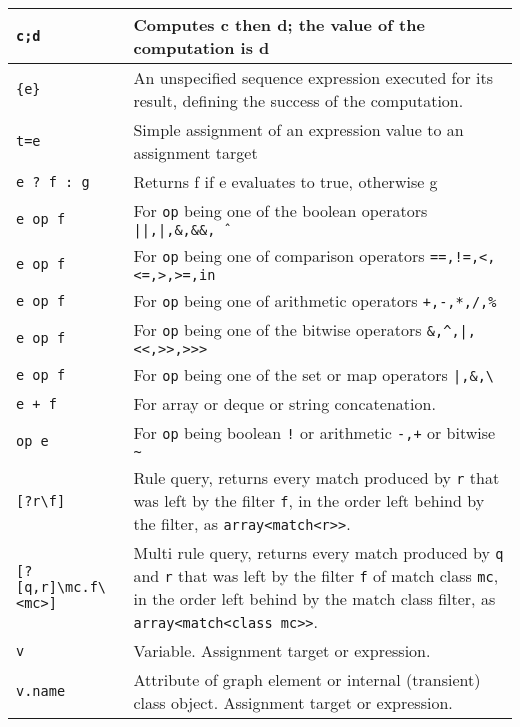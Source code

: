 \begin{table}[htbp]
\begin{minipage}{\linewidth} \renewcommand{\footnoterule}{} 
\begin{tabularx}{\linewidth}{|lX|}
\hline
\texttt{c;d} & Computes c then d; the value of the computation is d\\
\hline
\texttt{\{e\}} & An unspecified sequence expression executed for its result, defining the success of the computation.\\
\hline
\texttt{t=e} & Simple assignment of an expression value to an assignment target\\
\hline
\texttt{e ? f : g} & Returns f if e evaluates to true, otherwise g \\
\texttt{e op f} & For \texttt{op} being one of the boolean operators \texttt{||,|,\&,\&\&,\^\ } \\
\texttt{e op f} & For \texttt{op} being one of comparison operators \texttt{==,!=,<,<=,>,>=,in} \\
\texttt{e op f} & For \texttt{op} being one of arithmetic operators \texttt{+,-,*,/,\%} \\
\texttt{e op f} & For \texttt{op} being one of the bitwise operators \texttt{\&,\^{},|,<<,>>,>>> } \\
\texttt{e op f} & For \texttt{op} being one of the set or map operators \texttt{|,\&,\textbackslash} \\
\texttt{e + f} & For array or deque or string concatenation. \\
\texttt{op e} & For \texttt{op} being boolean \texttt{!} or arithmetic \texttt{-,+} or bitwise \texttt{\textasciitilde}\\
\hline
\texttt{[?r\textbackslash f]} & Rule query, returns every match produced by \texttt{r} that was left by the filter \texttt{f}, in the order left behind by the filter, as \texttt{array<match<r>>}. \\
\texttt{[?[q,r]\textbackslash mc.f\textbackslash<mc>]} & Multi rule query, returns every match produced by \texttt{q} and \texttt{r} that was left by the filter \texttt{f} of match class \texttt{mc}, in the order left behind by the match class filter, as \texttt{array<match<class mc>>}. \\
\hline
\texttt{v} & Variable. Assignment target or expression.\\
\texttt{v.name} & Attribute of graph element or internal (transient) class object. Assignment target or expression.\\

\end{tabularx}
\end{minipage}
\end{table}
